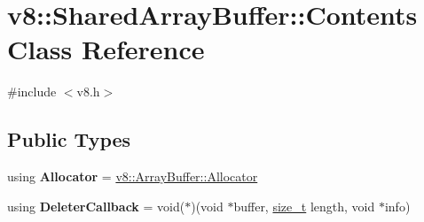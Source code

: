 \hypertarget{classv8_1_1SharedArrayBuffer_1_1Contents}{}\section{v8\+:\+:Shared\+Array\+Buffer\+:\+:Contents Class Reference}
\label{classv8_1_1SharedArrayBuffer_1_1Contents}


{\ttfamily \#include $<$v8.\+h$>$}

\subsection*{Public Types}
\begin{DoxyCompactItemize}
\item 
\mbox{\label{classv8_1_1SharedArrayBuffer_1_1Contents_a9b3beca611144f6514647ce8e6937be7}} 
using {\bfseries Allocator} = \mbox{\hyperlink{classv8_1_1ArrayBuffer_1_1Allocator}{v8\+::\+Array\+Buffer\+::\+Allocator}}
\item 
\mbox{\label{classv8_1_1SharedArrayBuffer_1_1Contents_a68a6bf80c68a3b8c6ac2eb6fb38169f0}} 
using {\bfseries Deleter\+Callback} = void($\ast$)(void $\ast$buffer, \mbox{\hyperlink{classsize__t}{size\+\_\+t}} length, void $\ast$info)
\end{DoxyCompactItemize}
